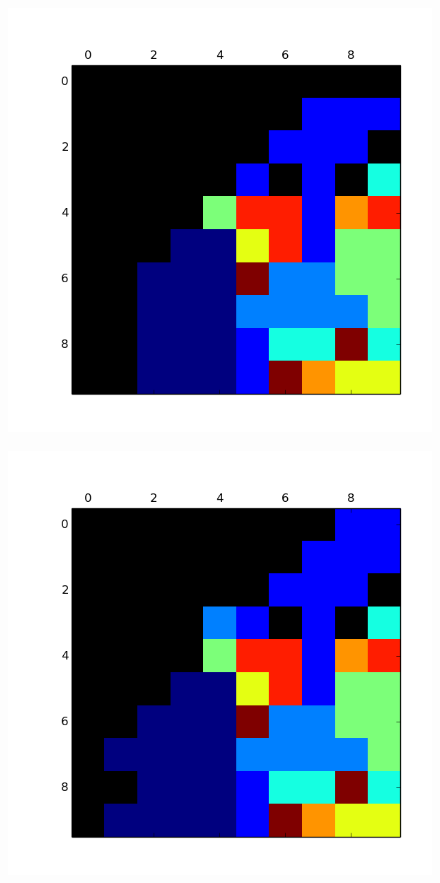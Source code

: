 \begin{figure}[h!]
\begin{minipage}{.15\textwidth}
  \label{fig:test2}
\end{minipage}
\begin{minipage}{.15\textwidth}
  \centering
  \includegraphics[width=.9\linewidth]{convergencia_kohonen/entrenamiento_50.png}
  \label{fig:test2}
\end{minipage}
\begin{minipage}{.15\textwidth}
  \centering
  \includegraphics[width=.9\linewidth]{convergencia_kohonen/entrenamiento_75.png}

\end{minipage}
\end{figure}
